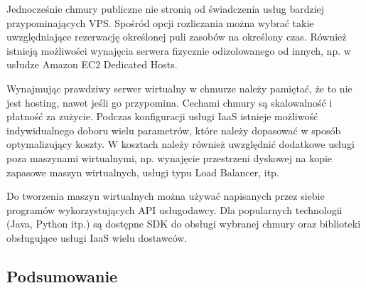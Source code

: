 \documentclass[12pt,a4paper,twoside,titlepage,openright]{book}
\begin{document}
Jednocześnie chmury publiczne nie stronią od świadczenia usług bardziej przypominających VPS. Spośród opcji rozliczania można wybrać takie uwzględniające rezerwację określonej puli zasobów na określony czas. Również istnieją możliwości wynajęcia serwera fizycznie odizolowanego od innych, np. w usłudze Amazon EC2 Dedicated Hosts.

Wynajmując prawdziwy serwer wirtualny w chmurze należy pamiętać, że to nie jest hosting, nawet jeśli go przypomina. Cechami chmury są skalowalność i płatność za zużycie. Podczas konfiguracji usługi IaaS istnieje możliwość indywidualnego doboru wielu parametrów, które należy dopasować w sposób optymalizujący koszty. W kosztach należy również uwzględnić dodatkowe usługi poza maszynami wirtualnymi, np. wynajęcie przestrzeni dyskowej na kopie zapasowe maszyn wirtualnych, usługi typu Load Balancer, itp.

Do tworzenia maszyn wirtualnych można używać napisanych przez siebie programów wykorzystujących API usługodawcy. Dla popularnych technologii (Java, Python itp.) są dostępne SDK do obsługi wybranej chmury oraz biblioteki obsługujące usługi IaaS wielu dostawców.

\subsection*{Podsumowanie}
\end{document}
